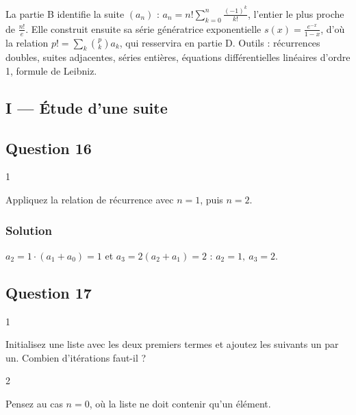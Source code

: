 \documentclass[11pt,a4paper]{article}
\begin{document}
La partie B identifie la suite \((a_n)\) : \(a_n=n!\sum_{k=0}^n\frac{(-1)^k}{k!}\), l'entier le plus proche de \(\frac{n!}e\). Elle construit ensuite sa série génératrice exponentielle \(s(x)=\frac{e^{-x}}{1-x}\), d'où la relation \(p!=\sum_k\binom pk a_k\), qui resservira en partie D. Outils : récurrences doubles, suites adjacentes, séries entières, équations différentielles linéaires d'ordre 1, formule de Leibniz.

\hypertarget{i-uxe9tude-dune-suite}{%
\subsection{I --- Étude d'une suite}\label{i-uxe9tude-dune-suite}}

\hypertarget{question-16}{%
\subsection{Question 16}\label{question-16}}

\begin{indication}{1}

Appliquez la relation de récurrence avec \(n=1\), puis \(n=2\).

\end{indication}

\hypertarget{solution-15}{%
\subsubsection{Solution}\label{solution-15}}

\(a_2=1\cdot(a_1+a_0)=1\) et \(a_3=2(a_2+a_1)=2\) : \(\boxed{a_2=1,\ a_3=2.}\)

\hypertarget{question-17}{%
\subsection{Question 17}\label{question-17}}

\begin{indication}{1}

Initialisez une liste avec les deux premiers termes et ajoutez les suivants un par un. Combien d'itérations faut-il ?

\end{indication}

\begin{indication}{2}

Pensez au cas \(n=0\), où la liste ne doit contenir qu'un élément.

\end{indication}
\end{document}
